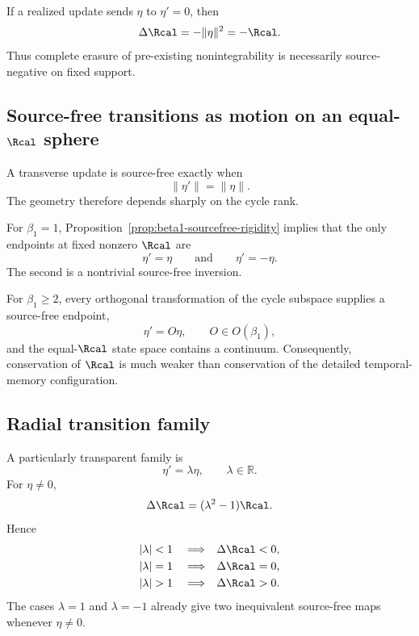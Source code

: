 \begin{proposition}
\label{prop:erasure}
If a realized update sends $\eta$ to $\eta'=0$, then
\begin{equation}
\Delta\Rcal=-\lVert\eta\rVert^2=-\Rcal.
\label{eq:erasure-law}
\end{equation}
Thus complete erasure of pre-existing nonintegrability is necessarily source-negative on fixed support.
\end{proposition}

\subsection{Source-free transitions as motion on an equal-$\Rcal$ sphere}

A transverse update is source-free exactly when
\begin{equation}
\lVert\eta'\rVert=\lVert\eta\rVert.
\label{eq:sourcefree-sphere}
\end{equation}
The geometry therefore depends sharply on the cycle rank.

For $\beta_1=1$, Proposition~\ref{prop:beta1-sourcefree-rigidity} implies that the only endpoints at fixed nonzero $\Rcal$ are
\begin{equation}
\eta'=\eta
\qquad\text{and}\qquad
\eta'=-\eta.
\end{equation}
The second is a nontrivial source-free inversion.

For $\beta_1\ge2$, every orthogonal transformation of the cycle subspace supplies a source-free endpoint,
\begin{equation}
\eta'=O\eta,
\qquad O\in O(\beta_1),
\label{eq:sourcefree-orthogonal}
\end{equation}
and the equal-$\Rcal$ state space contains a continuum. Consequently, conservation of $\Rcal$ is much weaker than conservation of the detailed temporal-memory configuration.

\subsection{Radial transition family}

A particularly transparent family is
\begin{equation}
\eta'=\lambda\eta,
\qquad\lambda\in\mathbb R.
\label{eq:radial-map}
\end{equation}
For $\eta\neq0$,
\begin{equation}
\Delta\Rcal=(\lambda^2-1)\Rcal.
\label{eq:radial-source}
\end{equation}
Hence
\begin{align}
|\lambda|&<1 &&\Longrightarrow &&\Delta\Rcal<0,\\
|\lambda|&=1 &&\Longrightarrow &&\Delta\Rcal=0,\\
|\lambda|&>1 &&\Longrightarrow &&\Delta\Rcal>0.
\end{align}
The cases $\lambda=1$ and $\lambda=-1$ already give two inequivalent source-free maps whenever $\eta\neq0$.

